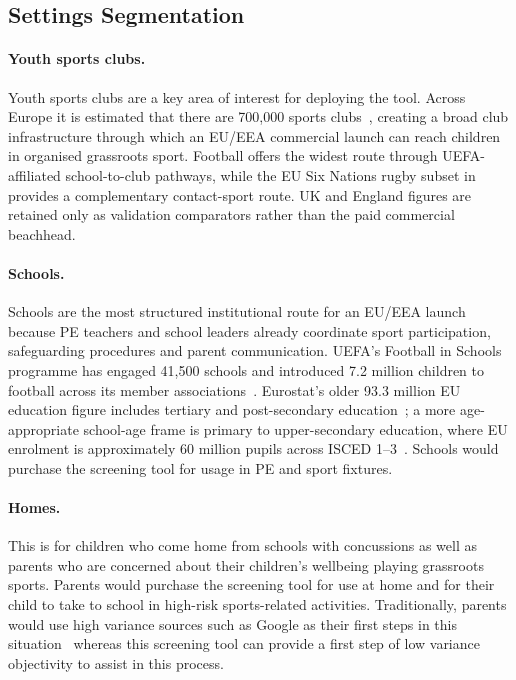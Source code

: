 \subsection{Settings Segmentation}

\paragraph{Youth sports clubs.} Youth sports clubs are a key area of interest for deploying the tool. Across Europe it is estimated that there are 700,000 sports clubs~\cite{nagel2020europeansportsclubs}, creating a broad club infrastructure through which an EU/EEA commercial launch can reach children in organised grassroots sport. Football offers the widest route through UEFA-affiliated school-to-club pathways, while the EU Six Nations rugby subset in  provides a complementary contact-sport route. UK and England figures are retained only as validation comparators rather than the paid commercial beachhead.

\paragraph{Schools.} Schools are the most structured institutional route for an EU/EEA launch because PE teachers and school leaders already coordinate sport participation, safeguarding procedures and parent communication. UEFA's Football in Schools programme has engaged 41,500 schools and introduced 7.2 million children to football across its member associations~\cite{uefa2025schools}. Eurostat's older 93.3 million EU education figure includes tertiary and post-secondary education~\cite{eurostat2022students}; a more age-appropriate school-age frame is primary to upper-secondary education, where EU enrolment is approximately 60 million pupils across ISCED 1--3~\cite{eurostat2023teachers,eurostat2025secondary}. Schools would purchase the screening tool for usage in PE and sport fixtures.

\paragraph{Homes.} This is for children who come home from schools with concussions as well as parents who are concerned about their children's wellbeing playing grassroots sports. Parents would purchase the screening tool for use at home and for their child to take to school in high-risk sports-related activities. Traditionally, parents would use high variance sources such as Google as their first steps in this situation~\cite{kubb2020parentshealthinfo} whereas this screening tool can provide a first step of low variance objectivity to assist in this process.

